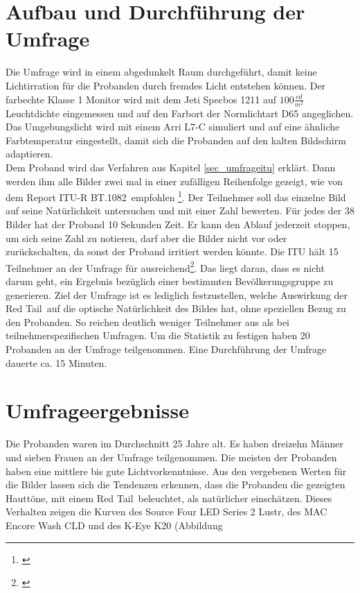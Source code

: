 \section{Aufbau und Durchführung der Umfrage} 
Die Umfrage wird in einem abgedunkelt Raum durchgeführt, damit keine Lichtirration für die Probanden durch fremdes Licht entstehen können. Der farbechte \glqq Klasse 1\grqq\- Monitor wird mit dem Jeti Specbos 1211 auf $100\frac{cd}{m^{2}}$ Leuchtdichte eingemessen und auf den Farbort der Normlichtart D65 angeglichen. Das Umgebungslicht wird mit einem Arri L7-C simuliert und  auf eine ähnliche Farbtemperatur eingestellt, damit sich die Probanden auf den kalten Bildschirm adaptieren.\\
Dem Proband wird das Verfahren aus Kapitel \ref{sec_umfrageitu} erklärt. Dann werden ihm alle Bilder zwei mal in einer zufälligen Reihenfolge gezeigt, wie von dem \glqq Report ITU-R BT.1082\grqq\ empfohlen \footnote{\cite[368]{itu90}}. Der Teilnehmer soll das einzelne Bild auf seine Natürlichkeit untersuchen und mit einer Zahl bewerten. Für jedes der 38 Bilder hat der Proband 10 Sekunden Zeit. Er kann den Ablauf jederzeit stoppen, um sich seine Zahl zu notieren, darf aber die Bilder nicht vor oder zurückschalten, da sonst der Proband irritiert werden könnte. Die ITU hält 15 Teilnehmer an der Umfrage für ausreichend\footnote{\cite[368]{itu90}}. Das liegt daran, dass es nicht darum geht, ein Ergebnis bezüglich einer bestimmten Bevölkerungsgruppe zu generieren. Ziel der Umfrage ist es lediglich festzustellen, welche Auswirkung der \glqq Red Tail\grqq\ auf die optische Natürlichkeit des Bildes hat, ohne speziellen Bezug zu den Probanden. So reichen deutlich weniger Teilnehmer aus als bei teilnehmerspezifischen Umfragen. Um die Statistik zu festigen haben 20 Probanden an der Umfrage teilgenommen. Eine Durchführung der Umfrage dauerte ca. 15 Minuten.


\newpage
\section{Umfrageergebnisse}
Die Probanden waren im Durchschnitt 25 Jahre alt. Es haben dreizehn Männer und sieben Frauen an der Umfrage teilgenommen. Die meisten der Probanden haben eine mittlere bis gute Lichtvorkenntnisse. 
Aus den vergebenen Werten für die Bilder lassen sich die Tendenzen erkennen, dass die Probanden die gezeigten Hauttöne, mit einem \glqq Red Tail\grqq\ beleuchtet, als natürlicher einschätzen. Dieses Verhalten zeigen die Kurven des Source Four LED Series 2 Lustr, des MAC Encore Wash CLD und des K-Eye K20 (Abbildung %

